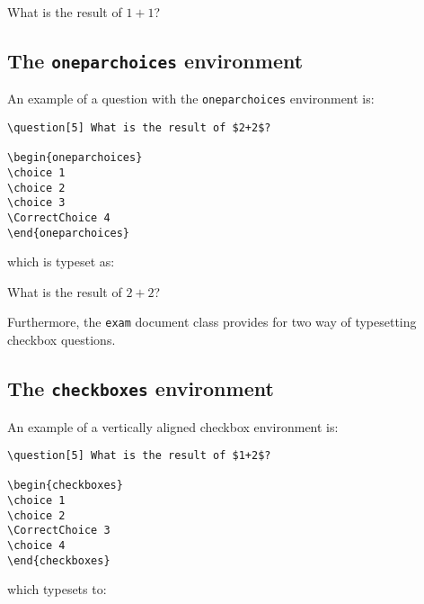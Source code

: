 \documentclass[12pt,a4paper]{exam}
\begin{document}
\begin{questions}
\setcounter{question}{0}
\question[5] What is the result of $1+1$?

\begin{choices}
\end{choices}
\end{questions}

\subsection{The \texttt{oneparchoices} environment}

An example of a question with the \texttt{oneparchoices} environment is:

\begin{lstlisting}
\question[5] What is the result of $2+2$?

\begin{oneparchoices}
\choice 1
\choice 2
\choice 3
\CorrectChoice 4
\end{oneparchoices}
\end{lstlisting}

which is typeset as:

\begin{questions}
\setcounter{question}{1}
\question[5] What is the result of $2+2$?

\begin{oneparchoices}
\end{oneparchoices}
\end{questions}

Furthermore, the \texttt{exam} document class provides for two way of typesetting
checkbox questions.

\subsection{The \texttt{checkboxes} environment}

An example of a vertically aligned checkbox environment is:

\begin{lstlisting}
\question[5] What is the result of $1+2$?

\begin{checkboxes}
\choice 1
\choice 2
\CorrectChoice 3
\choice 4
\end{checkboxes}
\end{lstlisting}

which typesets to:
\end{document}
